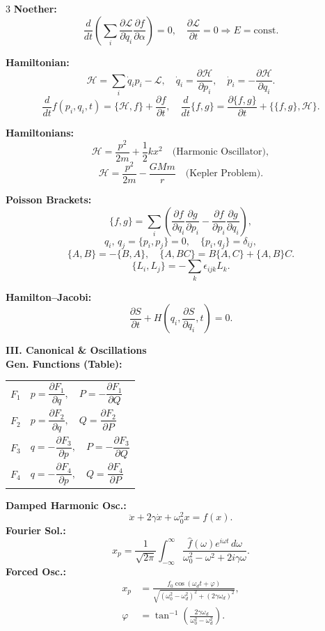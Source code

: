 \documentclass[1pt]{article}
\begin{document}
\begin{multicols}{3}
\textbf{Noether:} 
\[
\frac{d}{dt}\left(\sum_i\frac{\partial\mathcal{L}}{\partial\dot{q}_i}\frac{\partial f}{\partial\alpha}\right)=0,
\quad \frac{\partial\mathcal{L}}{\partial t}=0\Rightarrow E=\text{const.}
\]

\textbf{Hamiltonian:} 
\[
\mathcal{H}=\sum_i\dot{q}_ip_i-\mathcal{L},\quad
\dot{q}_i=\frac{\partial\mathcal{H}}{\partial p_i},\quad
\dot{p}_i=-\frac{\partial\mathcal{H}}{\partial q_i}.
\]
\[
\frac{d}{dt}f(p_i,q_i,t)
=\{ \mathcal{H},f \}+\frac{\partial f}{\partial t},
\quad \frac{d}{dt}\{ f,g \}
=\frac{\partial\{ f,g \}}{\partial t}+\{\{ f,g \},\mathcal{H}\}.
\]

\textbf{Hamiltonians:} 
\[
\mathcal{H}=\frac{p^2}{2m}+\frac{1}{2}kx^2\quad\text{(Harmonic Oscillator)},
\]
\[
\mathcal{H}=\frac{p^2}{2m}-\frac{GMm}{r}\quad\text{(Kepler Problem)}.
\]

\textbf{Poisson Brackets:} 
\[
\{f,g\}=\sum_i\left(\frac{\partial f}{\partial q_i}\frac{\partial g}{\partial p_i}
-\frac{\partial f}{\partial p_i}\frac{\partial g}{\partial q_i}\right),
\]
\[
q_i,\,q_j= \{p_i,p_j\}=0,\quad \{p_i,q_j\}=\delta_{ij},
\]
\[
\{A,B\}=-\{B,A\},\quad \{A,BC\}=B\{A,C\}+\{A,B\}C.
\]
\[
\{L_i,L_j\}=-\sum_k\epsilon_{ijk}L_k.
\]

\textbf{Hamilton--Jacobi:} 
\[
\frac{\partial S}{\partial t}+H\left(q_i,\frac{\partial S}{\partial q_i},t\right)=0.
\]

\textbf{III. Canonical \& Oscillations}\\[2pt]
\textbf{Gen. Functions (Table):}
\begin{center}
\begin{tabular}{c l}
$F_1$ & $p=\dfrac{\partial F_1}{\partial q},\quad P=-\dfrac{\partial F_1}{\partial Q}$\\[4pt]
$F_2$ & $p=\dfrac{\partial F_2}{\partial q},\quad Q=\dfrac{\partial F_2}{\partial P}$\\[4pt]
$F_3$ & $q=-\dfrac{\partial F_3}{\partial p},\quad P=-\dfrac{\partial F_3}{\partial Q}$\\[4pt]
$F_4$ & $q=-\dfrac{\partial F_4}{\partial p},\quad Q=\dfrac{\partial F_4}{\partial P}$
\end{tabular}
\end{center}

\textbf{Damped Harmonic Osc.:} 
\[
\ddot{x}+2\gamma\dot{x}+\omega_0^2x=f(x).
\]
\textbf{Fourier Sol.:} 
\[
x_p=\frac{1}{\sqrt{2\pi}}\int_{-\infty}^{\infty}\frac{\hat{f}(\omega)e^{i\omega t}\,d\omega}
{\omega_0^2-\omega^2+2i\gamma\omega}.
\]
\textbf{Forced Osc.:} 
\begin{align}
x_p&=\frac{f_0\cos(\omega_dt+\varphi)}
{\sqrt{(\omega_0^2-\omega_d^2)^2+(2\gamma\omega_d)^2}},\\[4pt]
\varphi&=\tan^{-1}\left(\frac{2\gamma\omega_d}{\omega_0^2-\omega_d^2}\right).
\end{align}


\end{multicols}
\end{document}

